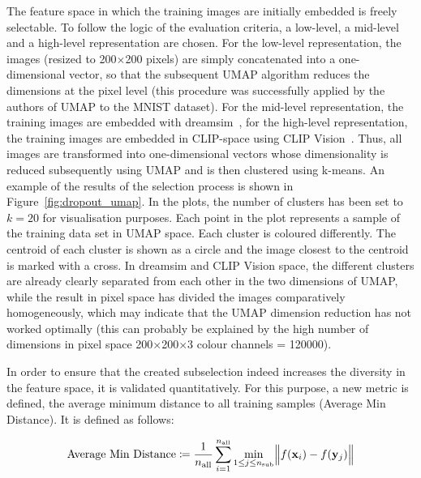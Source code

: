 The feature space in which the training images are initially embedded is freely selectable. To follow the logic of the evaluation criteria, a low-level, a mid-level and a high-level representation are chosen. For the low-level representation, the images (resized to 200$\times$200 pixels) are simply concatenated into a one-dimensional vector, so that the subsequent UMAP algorithm reduces the dimensions at the pixel level (this procedure was successfully applied by the authors of UMAP to the MNIST dataset). For the mid-level representation, the training images are embedded with dreamsim~\cite{fuDreamSimLearningNew2023}, for the high-level representation, the training images are embedded in CLIP-space using CLIP Vision~\cite{radfordLearningTransferableVisual2021}. Thus, all images are transformed into one-dimensional vectors whose dimensionality is reduced subsequently using UMAP and is then clustered using k-means. 
An example of the results of the selection process is shown in Figure~\ref{fig:dropout_umap}. In the plots, the number of clusters has been set to $k=20$ for visualisation purposes. Each point in the plot represents a sample of the training data set in UMAP space. Each cluster is coloured differently. The centroid of each cluster is shown as a circle and the image closest to the centroid is marked with a cross. In dreamsim and CLIP Vision space, the different clusters are already clearly separated from each other in the two dimensions of UMAP, while the result in pixel space has divided the images comparatively homogeneously, which may indicate that the UMAP dimension reduction has not worked optimally (this can probably be explained by the high number of dimensions in pixel space 200$\times$200$\times$3 colour channels = 120000). 

In order to ensure that the created subselection indeed increases the diversity in the feature space, it is validated quantitatively. For this purpose, a new metric is defined, the average minimum distance to all training samples (Average Min Distance). It is defined as follows:

\[
\text{Average Min Distance}
\coloneq \frac{1}{n_{\text{all}}}
  \sum_{i=1}^{n_{\text{all}}}
    \min_{1 \le j \le n_{\text{sub}}}
      \Bigl\lVert f(\mathbf{x}_i) - f(\mathbf{y}_j) \Bigr\rVert
\]

\noindent{}

